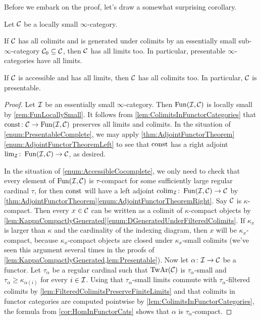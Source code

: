 Before we embark on the proof, let's draw a somewhat surprising corollary.
\begin{cor}\label{cor:PresentableComplete}
	Let $\mathcal{C}$ be a locally small $\infty$-category.
	\begin{alphanumerate}
		\item If $\mathcal{C}$ has all colimits and is generated under colimits by an essentially small sub-$\infty$-category $\mathcal{C}_0\subseteq \mathcal{C}$, then $\mathcal{C}$ has all limits too. In particular, presentable $\infty$-categories have all limits.\label{enum:PresentableComplete}
		\item If $\mathcal{C}$ is accessible and has all limits, then $\mathcal{C}$ has all colimits too. In particular, $\mathcal{C}$ is presentable.\label{enum:AccessibleCocomplete}
	\end{alphanumerate}
\end{cor}
\begin{proof}
	Let $\mathcal{I}$ be an essentially small $\infty$-category. Then $\operatorname{Fun}(\mathcal{I},\mathcal{C})$ is locally small by \cref{rem:FunLocallySmall}. It follows from \cref{lem:ColimitsInFunctorCategories} that $\operatorname{const}\colon \mathcal{C}\rightarrow\operatorname{Fun}(\mathcal{I},\mathcal{C})$ preserves all limits and colimits. In the situation of \cref{enum:PresentableComplete}, we may apply \cref{thm:AdjointFunctorTheorem}\cref{enum:AdjointFunctorTheoremLeft} to see that $\operatorname{const}$ has a right adjoint $\operatorname*{lim}_{\mathcal{I}}\colon \operatorname{Fun}(\mathcal{I},\mathcal{C})\rightarrow\mathcal{C}$, as desired.
	
	In the situation of \cref{enum:AccessibleCocomplete}, we only need to check that every element of $\operatorname{Fun}(\mathcal{I},\mathcal{C})$ is $\tau$-compact for some sufficiently large regular cardinal $\tau$, for then $\operatorname{const}$ will have a left adjoint $\operatorname*{colim}_{\mathcal{I}}\colon \operatorname{Fun}(\mathcal{I},\mathcal{C})\rightarrow\mathcal{C}$ by \cref{thm:AdjointFunctorTheorem}\cref{enum:AdjointFunctorTheoremRight}. Say $\mathcal{C}$ is $\kappa$-compact. Then every $x\in\mathcal{C}$ can be written as a colimit of $\kappa$-compact objects by \cref{lem:KappaCompactlyGenerated}\cref{enum:DGeneratedUnderFilteredColimits}. If $\kappa_x$ is larger than $\kappa$ and the cardinality of the indexing diagram, then $x$ will be $\kappa_x$-compact, because $\kappa_x$-compact objects are closed under $\kappa_x$-small colimits (we've seen this argument several times in the proofs of \cref{lem:KappaCompactlyGenerated,lem:Presentable}). Now let $\alpha\colon \mathcal{I}\rightarrow\mathcal{C}$ be a functor. Let $\tau_\alpha$ be a regular cardinal such that $\operatorname{TwAr}(\mathcal{C})$ is $\tau_\alpha$-small and $\tau_\alpha\geqslant \kappa_{\alpha(i)}$ for every $i\in\mathcal{I}$. Using that $\tau_\alpha$-small limits commute with $\tau_\alpha$-filtered colimits by \cref{lem:FilteredColimitsPreserveFiniteLimits} and that colimits in functor categories are computed pointwise by \cref{lem:ColimitsInFunctorCategories}, the formula from \cref{cor:HomInFunctorCats} shows that $\alpha$ is $\tau_\alpha$-compact.
\end{proof}
